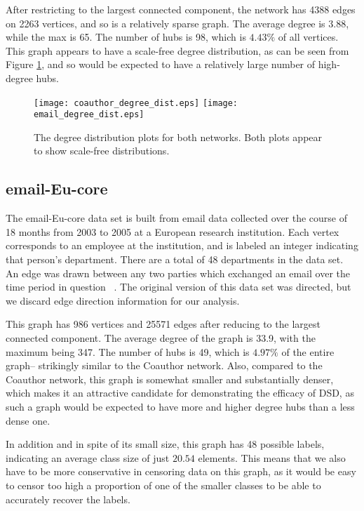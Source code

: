 After restricting to the largest connected component, the network has 4388 edges on 2263 vertices,
and so is a relatively sparse graph. The average degree is 3.88, while the max is 65. The number of
hubs is 98, which is $4.43\%$ of all vertices. This graph appears to have a scale-free degree
distribution, as can be seen from Figure \ref{fig:real_world_degree_dist}, and so would be expected
to have a relatively large number of high-degree hubs.

\begin{figure}
  \centering
  \texttt{[image: coauthor\_degree\_dist.eps]}
  \texttt{[image: email\_degree\_dist.eps]}
  \caption{The degree distribution plots for both networks. Both plots appear to show scale-free
    distributions.}
  \label{fig:real_world_degree_dist}
\end{figure}


\subsection{email-Eu-core}

The email-Eu-core data set is built from email data collected over the course of 18 months from 2003
to 2005 at a European research institution. Each vertex corresponds to an employee at the
institution, and is labeled an integer indicating that person's department. There are a total of 48
departments in the data set. An edge was drawn between any two parties which exchanged an email over
the time period in question ~\cite{snapnets}. The original version of this data set was directed,
but we discard edge direction information for our analysis.

This graph has 986 vertices and 25571 edges after reducing to the largest connected component. The
average degree of the graph is 33.9, with the maximum being 347. The number of hubs is 49, which is
$4.97\%$ of the entire graph-- strikingly similar to the Coauthor network. Also, compared to the
Coauthor network, this graph is somewhat smaller and substantially denser, which makes it an
attractive candidate for demonstrating the efficacy of DSD, as such a graph would be expected to
have more and higher degree hubs than a less dense one.

In addition and in spite of its small size, this graph has 48 possible labels, indicating an average
class size of just $20.54$ elements. This means that we also have to be more conservative in
censoring data on this graph, as it would be easy to censor too high a proportion of one of the
smaller classes to be able to accurately recover the labels.


